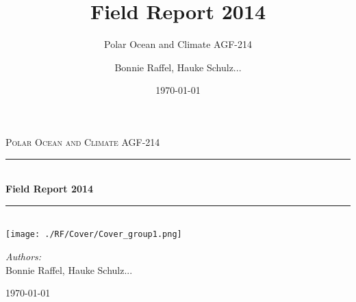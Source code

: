 \documentclass[12pt,a4paper,notitlepage,twoside]{scrreprt}
\begin{document}
\begin{titlepage}
\title{Field Report 2014}
\subtitle{Polar Ocean and Climate AGF-214}
\vfill
\vfill
\vfill
\author{Bonnie Raffel, Hauke Schulz...}
\date{\today}
\vfill
\vfill
\end{titlepage}
\begin{titlepage}

\begin{center}



\textsc{\Large Polar Ocean and Climate AGF-214}\\[0.5cm]


\newcommand{\HRule}{\rule{\linewidth}{0.5mm}}
\HRule \\[0.4cm]
{ \huge \bfseries Field Report 2014}\\[0.4cm]

\HRule \\[1.5cm]
\texttt{[image: ./RF/Cover/Cover\_group1.png]} %


\begin{minipage}{\textwidth}
\begin{flushleft} \large
\emph{Authors:}\\
Bonnie Raffel, Hauke Schulz...
\end{flushleft}
\end{minipage}
\hfill

\vfill

{\large \today}

\end{center}

\end{titlepage}
 \newpage \thispagestyle{empty} \mbox{}
\end{document}
